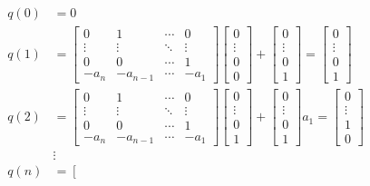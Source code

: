 \documentclass[a4paper,twoside,10pt,english]{report}
\begin{document}
\begin{align*}
q\left(0\right) &= 0\\
q\left(1\right) &= \left[\begin{array}{cccc}
0 & 1 & \cdots & 0\\
\vdots & \vdots & \ddots & \vdots\\
0 & 0 & \cdots & 1\\
-a_{n} & -a_{n-1} & \cdots & -a_{1}
\end{array}\right]\left[\begin{array}{c}
0\\
\vdots\\
0\\
0
\end{array}\right]+\left[\begin{array}{c}
0\\
\vdots\\
0\\
1
\end{array}\right]=\left[\begin{array}{c}
0\\
\vdots\\
0\\
1
\end{array}\right]\\
q\left(2\right) &= \left[\begin{array}{cccc}
0 & 1 & \cdots & 0\\
\vdots & \vdots & \ddots & \vdots\\
0 & 0 & \cdots & 1\\
-a_{n} & -a_{n-1} & \cdots & -a_{1}
\end{array}\right]\left[\begin{array}{c}
0\\
\vdots\\
0\\
1
\end{array}\right]+\left[\begin{array}{c}
0\\
\vdots\\
0\\
1
\end{array}\right]a_{1}=\left[\begin{array}{c}
0\\
\vdots\\
1\\
0
\end{array}\right]\\
 & \vdots\\
q\left(n\right) &= \left[\begin{array}{cccc}

\end{array}
\end{align*}
\end{document}
